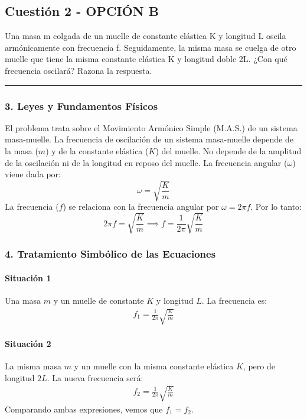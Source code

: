 \newpage

\subsection{Cuestión 2 - OPCIÓN B}
\label{subsec:2B_2008_jun_ord}
\begin{cajaenunciado}
Una masa m colgada de un muelle de constante elástica K y longitud L oscila armónicamente con frecuencia f. Seguidamente, la misma masa se cuelga de otro muelle que tiene la misma constante elástica K y longitud doble 2L. ¿Con qué frecuencia oscilará? Razona la respuesta.
\end{cajaenunciado}
\hrule

\subsubsection*{3. Leyes y Fundamentos Físicos}
El problema trata sobre el Movimiento Armónico Simple (M.A.S.) de un sistema masa-muelle.
La frecuencia de oscilación de un sistema masa-muelle depende de la masa ($m$) y de la constante elástica ($K$) del muelle. No depende de la amplitud de la oscilación ni de la longitud en reposo del muelle.
La frecuencia angular ($\omega$) viene dada por:
$$ \omega = \sqrt{\frac{K}{m}} $$
La frecuencia ($f$) se relaciona con la frecuencia angular por $\omega = 2\pi f$. Por lo tanto:
$$ 2\pi f = \sqrt{\frac{K}{m}} \implies f = \frac{1}{2\pi}\sqrt{\frac{K}{m}} $$

\subsubsection*{4. Tratamiento Simbólico de las Ecuaciones}
\paragraph{Situación 1}
Una masa $m$ y un muelle de constante $K$ y longitud $L$. La frecuencia es:
\begin{gather}
    f_1 = \frac{1}{2\pi}\sqrt{\frac{K}{m}}
\end{gather}
\paragraph{Situación 2}
La misma masa $m$ y un muelle con la misma constante elástica $K$, pero de longitud $2L$. La nueva frecuencia será:
\begin{gather}
    f_2 = \frac{1}{2\pi}\sqrt{\frac{K}{m}}
\end{gather}
Comparando ambas expresiones, vemos que $f_1 = f_2$.


